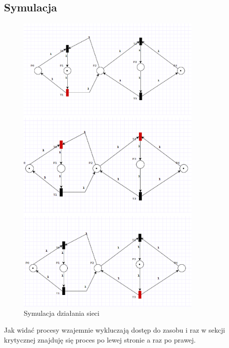 \documentclass{article}
\begin{document}
\subsection{Symulacja}
\begin{figure}[H]
    \centering
    \includegraphics[width=0.8\textwidth, height=0.9\textheight]{zad3_simulation.png}
    \caption{Symulacja działania sieci}
\end{figure}

Jak widać procesy wzajemnie wykluczają dostęp do zasobu i raz w sekcji krytycznej znajduję
się proces po lewej stronie a raz po prawej.
\end{document}
